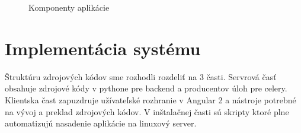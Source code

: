 \begin{figure}[htbp]
 \centering 
 \begin{minipage}{0.95\linewidth}
 	\centering
 \end{minipage}
  \caption{Komponenty aplikácie }
  \label{fig:components}
\end{figure}

\section{Implementácia systému}
Štruktúru zdrojových kódov sme rozhodli rozdeliť na 3 časti. Servrová časť obsahuje zdrojové kódy v pythone pre backend a producentov úloh pre celery. Klientska čast zapuzdruje užívateľské rozhranie v Angular 2 a nástroje potrebné na vývoj a preklad zdrojových kódov. V inštalačnej časti sú skripty ktoré plne automatizujú nasadenie aplikácie na linuxový server.